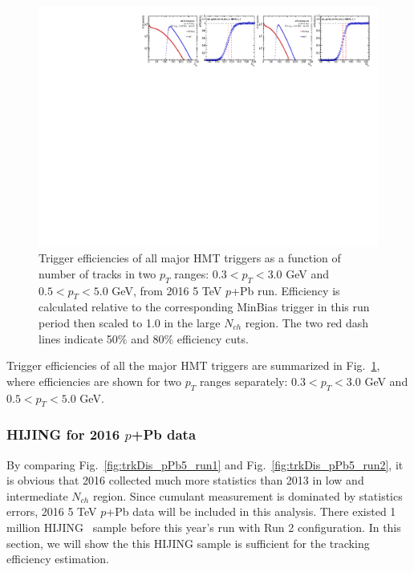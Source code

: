 \begin{figure}[H]
\centering
\includegraphics[width=1.\linewidth]{figs/sec_evtSlc/trigEff_pPb5_run2/trigEff_Trig11.pdf}
\caption{Trigger efficiencies of all major HMT triggers as a function of number of tracks in two $p_{T}$ ranges: $0.3<p_{T}<3.0$ GeV and $0.5<p_{T}<5.0$ GeV, from 2016 5 TeV $p$+Pb run. Efficiency is calculated relative to the corresponding MinBias trigger in this run period then scaled to 1.0 in the large $N_{ch}$ region. The two red dash lines indicate 50$\%$ and 80$\%$ efficiency cuts.}
\label{fig:trigEff_pPb5_run2}
\end{figure}
Trigger efficiencies of all the major HMT triggers are summarized in Fig.~\ref{fig:trigEff_pPb5_run2}, where efficiencies are shown for two $p_{T}$ ranges separately: $0.3<p_{T}<3.0$ GeV and $0.5<p_{T}<5.0$ GeV.



\subsubsection{HIJING for 2016 $p$+Pb data}
By comparing Fig.~\ref{fig:trkDis_pPb5_run1} and Fig.~\ref{fig:trkDis_pPb5_run2}, it is obvious that 2016 collected much more statistics than 2013 in low and intermediate $N_{ch}$ region. Since cumulant measurement is dominated by statistics errors, 2016 5 TeV $p$+Pb data will be included in this analysis. There existed 1 million HIJING~\cite{Gyulassy:1994ew} sample before this year's run with Run 2 configuration. In this section, we will show the this HIJING sample is sufficient for the tracking efficiency estimation.

